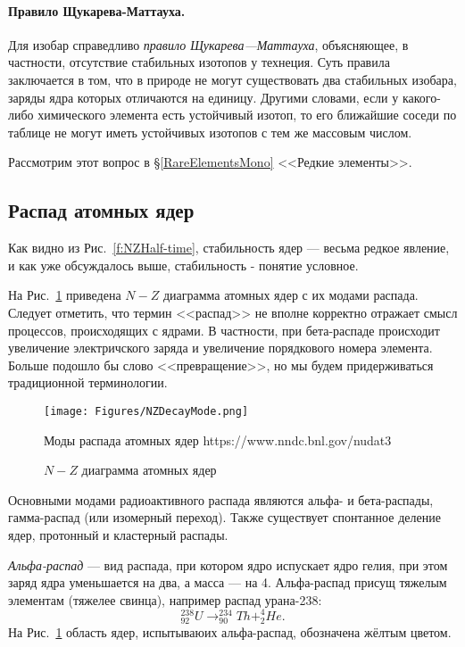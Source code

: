 \documentclass[a5paper,openany]{book}
\begin{document}
	\paragraph{Правило Щукарева-Маттауха.}


Для изобар справедливо \emph{правило Щукарева—Маттауха}, объясняющее, в частности, отсутствие стабильных изотопов у технеция. 
Суть правила заключается в том, что в природе не могут существовать два стабильных изобара, заряды ядра которых отличаются на единицу. Другими словами, если у какого-либо химического элемента есть устойчивый изотоп, то его ближайшие соседи по таблице не могут иметь устойчивых изотопов с тем же массовым числом. %

Рассмотрим этот вопрос в \S\ref{RareElementsMono} <<Редкие элементы>>.

	

  	\subsection{Распад атомных ядер} \label{NucleiDecay}
	
	Как видно из Рис.~\ref{f:NZHalf-time}, стабильность ядер --- весьма редкое явление, и как уже обсуждалось выше, стабильность - понятие условное.
	
	
	На  Рис.~\ref{f:NZDecayMode} приведена $N-Z$ диаграмма  атомных ядер с их модами распада.  Следует отметить, что термин <<распад>> не вполне корректно отражает смысл процессов, происходящих с ядрами. В частности, при бета-распаде происходит увеличение электричского заряда и увеличение порядкового номера элемента. Больше подошло бы слово <<превращение>>, но мы будем придерживаться традиционной терминологии.	
	
	
	\begin{figure}[ht] 
		\centering\small
		\unitlength=1mm
		\texttt{[image: Figures/NZDecayMode.png]} 
		\caption{$N-Z$ диаграмма  атомных ядер} Моды распада атомных ядер https://www.nndc.bnl.gov/nudat3 
		\label{f:NZDecayMode}
	\end{figure}
	Основными модами радиоактивного распада являются альфа- и бета-распады, гамма-распад (или изомерный переход). Также существует спонтанное деление ядер, протонный и кластерный распады. 
	
	
	\emph{Альфа-распад} --- вид распада, при котором ядро испускает ядро гелия, при этом заряд ядра уменьшается на два, а масса --- на 4. Альфа-распад присущ тяжелым элементам (тяжелее свинца), например распад урана-238:  	
	\begin{equation*}
	^{238}_{92}U \rightarrow ^{234}_{90}Th  + ^{4}_{2}He.
	\end{equation*}
	На  Рис.~\ref{f:NZDecayMode} область ядер, испытываюих альфа-распад, обозначена жёлтым цветом.
	
\end{document}
